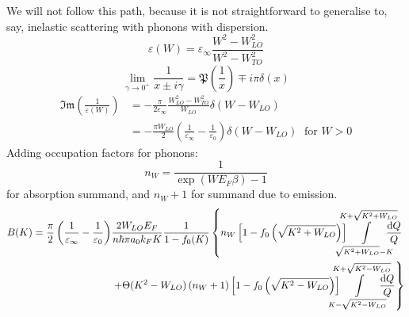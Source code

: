 \documentclass[physics,phd,nolot,nolof]{uccthesis}%
\begin{document}
{We will not follow this path, because it is not straightforward to 
generalise to, say, inelastic scattering with phonons with dispersion.
\begin{equation}
  \varepsilon(W)=\varepsilon_\infty\frac{W^2-W^2_{LO}}{W^2-W^2_{TO}}
  \label{eq:eps-LO}
\end{equation}
\begin{equation}
  \lim_{\gamma\to0^+}\frac{1}{x\pm i\gamma}=\mathfrak{P}(\frac{1}{x}) \mp i\pi\delta(x)
  \label{eq:1/zPVdelt}
\end{equation}
\begin{equation}
  \begin{split}
  \mathfrak{Im}(\frac{1}{\varepsilon(W)})
 & = -\frac{\pi}{2\varepsilon_\infty}\frac{W_{LO}^2-W_{TO}^2}{W_{LO}}\delta(W-W_{LO})
  \\
 & =-\frac{\pi W_{LO}}{2}\left(\frac{1}{\varepsilon_\infty}-\frac{1}{\varepsilon_0}\right)\delta(W-W_{LO})
 \; \text{ for } W>0
  \label{eq:imeps-LO}
  \end{split}
\end{equation}
Adding occupation factors for phonons:
\begin{equation}
  n_W = \frac{1}{\exp\left(W E_F\beta\right) -1}
  \label{eq:nW}
\end{equation}
for absorption summand, and 
$n_W+1$ for summand due to emission.
\begin{equation}
  \begin{split}
B(K) =
 \frac{\pi}{2}\left(\frac{1}{\varepsilon_\infty}-\frac{1}{\varepsilon_0}\right)
 &\frac{2W_{LO}E_F}{n\hbar \pi a_0k_F K} 
\frac{1}{1-f_0(K)}
\left\{
n_W\left[1-f_0\left(\sqrt{K^2+W_{LO}}\right)\right] 
\mkern-20mu%
\int\limits_{\sqrt{K^2+W_{LO}}-K}^{K+\sqrt{K^2+W_{LO}}}\mkern-20mu\frac{\mathrm{d}Q}{Q}
\right.\\
&\left.
+\Theta(K^2-W_{LO})
\left(n_W+1\right)
\left[1-f_0\left(\sqrt{K^2-W_{LO}}\right)\right] 
\mkern-20mu%
\int\limits_{K-\sqrt{K^2-W_{LO}}}^{K+\sqrt{K^2-W_{LO}}}\mkern-20mu\frac{\mathrm{d}Q}{Q}
\right\}
\end{split}
  \label{eq:BK-LO}
\end{equation}
}
\end{document}
